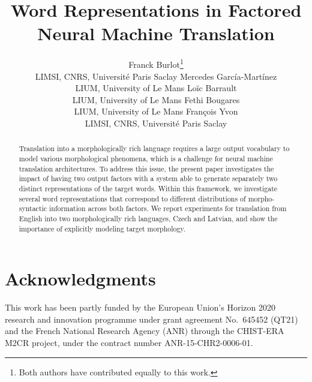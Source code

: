 \documentclass[11pt,letterpaper]{article}
\title{Word Representations in Factored Neural Machine Translation}
\author{Franck Burlot\thanks{\hspace{1.5mm}Both authors have contributed equally to this work.} \\ LIMSI, CNRS, Universit\'{e} Paris Saclay
  \And Mercedes Garc\'{i}a-Mart\'{i}nez\footnotemark[1] \\ LIUM, University of Le Mans
  \AND Lo\"{i}c Barrault  \\ LIUM, University of Le Mans
  \And Fethi Bougares \\ LIUM, University of Le Mans
  \AND Fran\c{c}ois Yvon \\ LIMSI, CNRS, Universit\'{e} Paris Saclay}
\date{}
\begin{document}
\maketitle

\begin{abstract}
  Translation into a morphologically rich language
  requires a large output vocabulary to model various
  morphological phenomena, which is a challenge for
  neural machine translation architectures. To address this issue,
  the present paper investigates the impact of having
  two output factors with a system able to generate
  separately two distinct representations of the target
  words. Within this framework, we investigate
  several word representations that correspond to
  different distributions of morpho-syntactic information
  across both factors. We report experiments for translation
  from English into two morphologically rich languages,
  Czech and Latvian, and show the importance of explicitly
  modeling target morphology.
\end{abstract}


















\section*{Acknowledgments}

This work has been partly funded by the European Union’s
Horizon 2020 research and innovation programme under grant
agreement No.~645452 (QT21) and the French National Research Agency (ANR) through the CHIST-ERA M2CR project, under the contract number ANR-15-CHR2-0006-01. 



\end{document}
